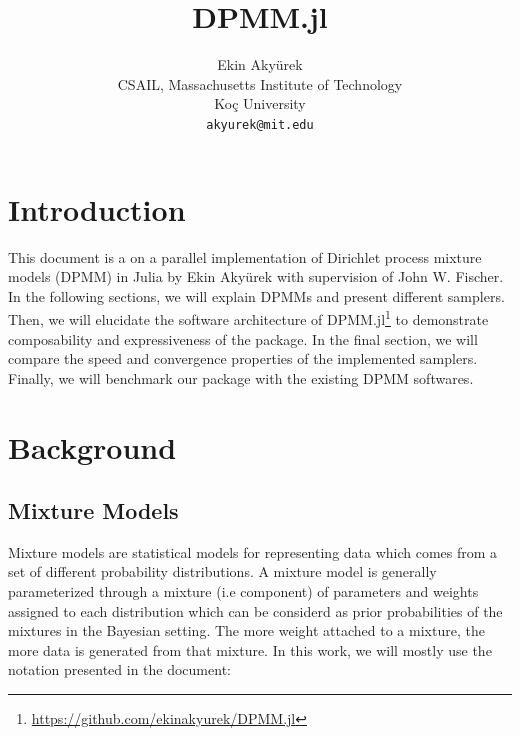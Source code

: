 \documentclass[12pt, a4paper]{article}
\title{DPMM.jl}
\author{
  Ekin Akyürek\\
   CSAIL, Massachusetts Institute of Technology\\
   Koç University\\
  \texttt{akyurek@mit.edu}
 }
\begin{document}
\maketitle
\begin{abstract}
    
\end{abstract}
\newpage
\tableofcontents

\newpage


\section{Introduction}

This document is a  on a parallel implementation of Dirichlet process mixture
models (DPMM) in Julia by Ekin Akyürek with supervision of John
W. Fischer. In the following sections, we will explain DPMMs and present different samplers. Then, we will elucidate the software architecture of DPMM.jl\footnote{\url{https://github.com/ekinakyurek/DPMM.jl}} to demonstrate composability and expressiveness of the package. In the final section, we will compare the speed and convergence properties of the implemented samplers. Finally, we will benchmark our package with the existing DPMM softwares.

\section{Background}

\subsection{Mixture Models}

Mixture models are statistical models for representing data which comes from a set of different probability distributions. A mixture model is generally
parameterized through a mixture (i.e component) of parameters and weights assigned to each distribution which can be considerd as prior probabilities of the mixtures in the Bayesian
setting. The more weight attached to a mixture, the more data is generated from
that mixture. In this work, we will mostly use the notation presented in the document\cite{kamper2013gibbs}:
\end{document}
